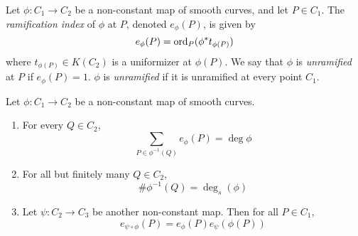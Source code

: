 
\begin{definition}
	Let $\phi: C_1 \to C_2$ be a non-constant map of smooth curves, and let
	$P \in C_1$. The \emph{ramification index} of $\phi$ at $P$, denoted
	$e_\phi(P)$, is given by
	\begin{equation*}
		e_\phi(P) = \operatorname{ord}_P(\phi^*t_{\phi(P)})
	\end{equation*}
	where $t_{\phi(P)} \in K(C_2)$ is a uniformizer at $\phi(P)$.
	We say that $\phi$ is \emph{unramified} at $P$ if $e_\phi(P) = 1$. $\phi$ is
	\emph{unramified} if it is unramified at every point $C_1$.
\end{definition}

\begin{proposition}
	\label{prop:ramification-properties}
	Let $\phi: C_1 \to C_2$ be a non-constant map of smooth curves.
	\begin{enumerate}[label=(\alph*)]
		\item For every $Q \in C_2$,
			\begin{equation*}
				\sum_{P \in \phi^{-1}(Q)}e_\phi(P) = \deg \phi
			\end{equation*}
		\item For all but finitely many $Q \in C_2$,
			\begin{equation*}
				\#\phi^{-1}(Q) = \deg_s(\phi)
			\end{equation*}
		\item Let $\psi: C_2 \to C_3$ be another non-constant map.
			Then for all $P \in C_1$,
			\begin{equation*}
				e_{\psi\circ\phi}(P) = e_{\phi}(P)e_{\psi}(\phi(P))
			\end{equation*}
	\end{enumerate}
\end{proposition}


